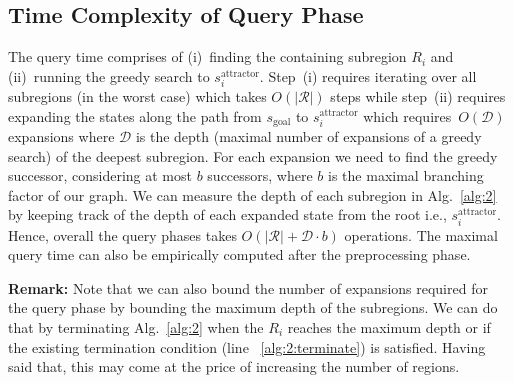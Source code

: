 \documentclass[letterpaper]{article} %
\newcommand{\calR}{\ensuremath{\mathcal{R}}\xspace}
\newcommand{\calD}{\ensuremath{\mathcal{D}}\xspace}
\newcommand{\sAttract}{\ensuremath{s^{\text{attractor}}_i}\xspace}
\newcommand{\sGoal}{\ensuremath{s_{\text{goal}}\xspace}}
\begin{document}
\subsection{Time Complexity of Query Phase}
\label{subsec:complexity}
The query time comprises of 
(i)~finding the containing subregion $R_i$ 
and
(ii)~running the greedy search to $\sAttract$.
Step~(i) requires iterating over all subregions (in the worst case) which takes $O(|\calR|)$ steps while 
step~(ii) requires expanding the states along the path from $\sGoal$ to $\sAttract$ which requires~$O(\calD)$ expansions where $\calD$ is the depth (maximal number of expansions of a greedy search) of the deepest subregion. 
For each expansion we need to find the greedy successor, considering at most $b$ successors, where $b$ is the maximal branching factor of our graph.
We can measure the depth of each subregion in Alg.~\ref{alg:2} by keeping track of the depth of each expanded state from the root i.e., $\sAttract$. Hence, overall the query phases takes $O(|\calR| + \calD \cdot b)$ operations. The maximal query time can also be empirically computed after the preprocessing phase.

%
\textbf{Remark:}
Note that we can also bound the number of expansions required for the query phase by bounding the maximum depth of the subregions. We can do that by terminating Alg.~\ref{alg:2} when the $R_i$ reaches the maximum depth or if the existing termination condition (line ~\ref{alg:2:terminate}) is satisfied.
Having said that, this may come at the price of increasing the number of regions.
\end{document}
